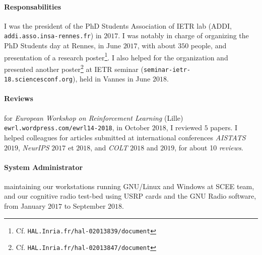 \paragraph{Responsabilities}
    I was the president of the PhD Students Association of IETR lab (ADDI, \texttt{addi.asso.insa-rennes.fr}) in $2017$.
    I was notably in charge of organizing the PhD Students day at Rennes, in June $2017$, with about $350$ people, and presentation of a research poster\footnote{Cf. \texttt{HAL.Inria.fr/hal-02013839/document}}.
    I also helped for the organization and presented another poster\footnote{Cf. \texttt{HAL.Inria.fr/hal-02013847/document}} at IETR seminar (\texttt{seminar-ietr-18.sciencesconf.org}), held in Vannes in June $2018$.

\paragraph{Reviews}
	for \emph{European Workshop on Reinforcement Learning} (Lille) \texttt{ewrl.wordpress.com/ewrl14-2018}, in October $2018$, I reviewed $5$ papers.
	I helped colleagues for articles submitted at international conferences \emph{AISTATS} $2019$, \emph{NeurIPS} $2017$ et $2018$, and \emph{COLT} $2018$ and $2019$, for about 10 \emph{reviews}.

\paragraph{System Administrator}
	maintaining our workstations running GNU/Linux and Windows
	at SCEE team,
	and our cognitive radio test-bed using USRP cards and the GNU Radio software,
	from January $2017$ to September $2018$.

